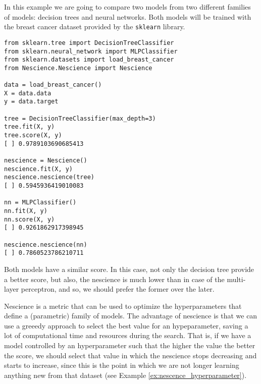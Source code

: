 \begin{example}
\label{ex:nescience_comparison}

In this example we are going to compare two models from two different families of models: decision trees and neural networks. Both models will be trained with the breast cancer dataset provided by the \texttt{sklearn} library.

\begin{sourcecode}
{\scriptsize \begin{verbatim}
from sklearn.tree import DecisionTreeClassifier
from sklearn.neural_network import MLPClassifier
from sklearn.datasets import load_breast_cancer
from Nescience.Nescience import Nescience

data = load_breast_cancer()
X = data.data
y = data.target

tree = DecisionTreeClassifier(max_depth=3)
tree.fit(X, y)
tree.score(X, y)
[ ] 0.9789103690685413

nescience = Nescience()
nescience.fit(X, y)
nescience.nescience(tree)
[ ] 0.5945936419010083

nn = MLPClassifier()
nn.fit(X, y)
nn.score(X, y)
[ ] 0.9261862917398945

nescience.nescience(nn)
[ ] 0.7860523786210711
\end{verbatim}}
\end{sourcecode}

Both models have a similar score. In this case, not only the decision tree provide a better score, but also, the nescience is much lower than in case of the multi-layer perceptron, and so, we should prefer the former over the later.

\end{example}

Nescience is a metric that can be used to optimize the hyperparameters that define a (parametric) family of models. The advantage of nescience is that we can use a greeedy approach to select the best value for an hypeparameter, saving a lot of computational time and resources during the search. That is, if we have a model controlled by an hyperparameter such that the higher the value the better the score, we should select that value in which the nescience stops decreasing and starts to increase, since this is the point in which we are not longer learning anything new from that dataset (see Example \ref{ex:nescence_hyperparameter}).

